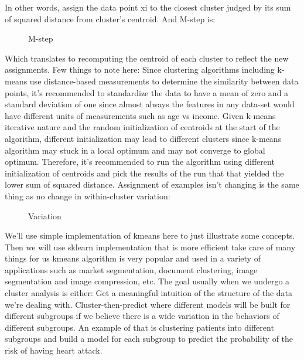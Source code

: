 \documentclass[12pt]{report}	%
\newcommand{\squeezeup}{\vspace{-0.6cm}}
\begin{document}
In other words, assign the data point xi to the closest cluster judged by its sum of squared distance from cluster’s centroid.
And M-step is:
\begin{figure}[!h]
	\captionsetup{font=scriptsize}
	\begin{center}
		\centerline{}
		\caption{M-step}
		\label{fig:1}
	\end{center}
	\squeezeup
\end{figure}

Which translates to recomputing the centroid of each cluster to reflect the new assignments.
Few things to note here:
Since clustering algorithms including k-means use distance-based measurements to determine the similarity between data points, it’s recommended to standardize the data to have a mean of zero and a standard deviation of one since almost always the features in any data-set would have different units of measurements such as age vs income.
Given k-means iterative nature and the random initialization of centroids at the start of the algorithm, different initialization may lead to different clusters since k-means algorithm may stuck in a local optimum and may not converge to global optimum. Therefore, it’s recommended to run the algorithm using different initialization of centroids and pick the results of the run that that yielded the lower sum of squared distance.
Assignment of examples isn’t changing is the same thing as no change in within-cluster variation:
\begin{figure}[!h]
	\captionsetup{font=scriptsize}
	\begin{center}
		\centerline{}
		\caption{Variation}
		\label{fig:1}
	\end{center}
	\squeezeup
\end{figure}
We’ll use simple implementation of kmeans here to just illustrate some concepts. Then we will use sklearn implementation that is more efficient take care of many things for us
kmeans algorithm is very popular and used in a variety of applications such as market segmentation, document clustering, image segmentation and image compression, etc.
The goal usually when we undergo a cluster analysis is either:
Get a meaningful intuition of the structure of the data we’re dealing with.
Cluster-then-predict where different models will be built for different subgroups if we believe there is a wide variation in the behaviors of different subgroups. An example of that is clustering patients into different subgroups and build a model for each subgroup to predict the probability of the risk of having heart attack.
\end{document}
